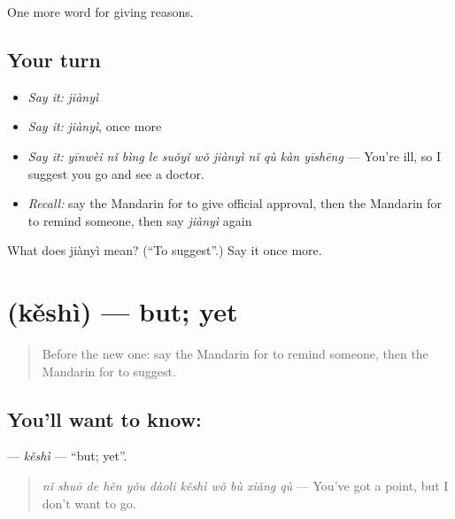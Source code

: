 \begin{grammarlens}[title={What you've built}]
One more word for giving reasons.
\end{grammarlens}

\subsection*{Your turn}
\begin{itemize}
\raggedright
  \item \emph{Say it:} \emph{jiànyì}
  \item \emph{Say it:} \emph{jiànyì}, once more
  \item \emph{Say it:} \emph{yīnwèi nǐ bìng le suǒyǐ wǒ jiànyì nǐ qù kàn yīshēng} — You're ill, so I suggest you go and see a doctor.
  \item \emph{Recall:} say the Mandarin for to give official approval, then the Mandarin for to remind someone, then say \emph{jiànyì} again
\end{itemize}

\begin{tcolorbox}[breakable,colback=teal!4,colframe=teal!35!black,title={Before you move on}]
What does jiànyì mean? (\textquotedblleft{}To suggest\textquotedblright{}.) Say it once more.
\end{tcolorbox}
\section[\texorpdfstring{\zh{可是} (kěshì)}{可是 (kěshì)}]{ (kěshì) — but; yet}

\label{lesson:ZH-C365-keshi}



\begin{quote}
Before the new one: say the Mandarin for to remind someone, then the Mandarin for to suggest.
\end{quote}

\subsection*{You'll want to know: }
\textbf{} — \emph{kěshì} — \textquotedblleft{}but; yet\textquotedblright{}.

\begin{quote}
\textbf{} \emph{nǐ shuō de hěn yǒu dàoli kěshì wǒ bù xiǎng qù} — You've got a point, but I don't want to go.
\end{quote}

